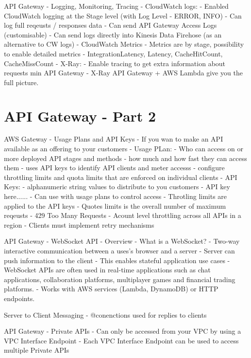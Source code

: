 \documentclass[11pt]{book}
\begin{document}
    API Gateway - Logging, Monitoring, Tracing
    - CloudWatch logs:
        - Enabled CloudWatch logging at the Stage level (with Log Level - ERROR, INFO)
        - Can log full reqeusts / responses data
        - Can send API Gateway Access Logs (customisable)
        - Can send logs directly into Kinesis Data Firehose (as an alternative to CW logs)
    - CloudWatch Metrics
        - Metrics are by stage, possibility to enable detailed metrics
        - IntegrationLatency, Latency, CacheHitCount, CacheMissCount
    - X-Ray:
        - Enable tracing to get extra information about requests min API Gateway
        - X-Ray API Gateway + AWS Lambda give you the full picture.

    \section{API Gateway - Part 2}
AWS Gateway - Usage Plans and API Keys
    - If you wan to make an API available as an offering to your customers
    - Usage PLan:
        - Who can access on or more deployed API stages and methods
        - how much and how fast they can access them
        - uses API keys to identify API clients and meter accesss
        - configure throttling limits and quota limits that are enforced on individual clients
    - API Keys:
        - alphanumeric string values to distribute to you customers
        - API key here......
        - Can use with usage plans to control access
        - Throtling limits are applied to the API keys
        - Quotes limits is the overall number of maximum reqeusts
    - 429 Too Many Requests
        - Acount level throttling across all APIs in a region
        - Clients must implement retry mechanisms

    API Gateway - WebSocket API - Overview
    - What is a WebSocket?
        - Two-way interactive communication between a uses's browser and a server
        - Server can push information to the client
        - This enables stateful application use cases
    - WebSocket APIs are often used in real-time applications such as chat applications, collaboration platforms, multiplayer games and financial trading platforms.
    - Works with AWS services (Lambda, DynamoDB) or HTTP endpoints.

    Server to Client Messaging - @conenctions used for replies to clients

    API Gateway - Private APIs
    - Can only be accessed from your VPC by using a VPC Interface Endpoint
    - Each VPC Interface Endpoint can be used to access multiple Private APIs
\end{document}
